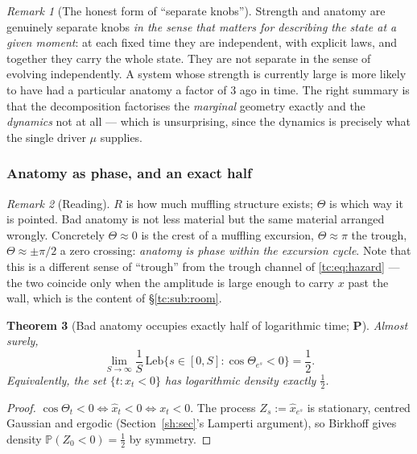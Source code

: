 \documentclass[11pt]{article}
\numberwithin{equation}{section}
\theoremstyle{plain}
\newtheorem{theorem}{Theorem}[section]
\theoremstyle{definition}
\theoremstyle{remark}
\newtheorem{remark}[theorem]{Remark}
\newcommand{\PP}{\mathbb{P}}
\begin{document}
\begin{remark}[The honest form of ``separate knobs'']
\label{tc:rem:knobs}
Strength and anatomy are genuinely separate knobs \emph{in the sense
that matters for describing the state at a given moment}: at each fixed
time they are independent, with explicit laws, and together they carry
the whole state. They are not separate in the sense of evolving
independently. A system whose strength is currently large is more likely
to have had a particular anatomy a factor of $3$ ago in time. The right
summary is that the decomposition factorises the \emph{marginal}
geometry exactly and the \emph{dynamics} not at all --- which is
unsurprising, since the dynamics is precisely what the single driver
$\mu$ supplies.
\end{remark}

\subsubsection{Anatomy as phase, and an exact half}
\label{tc:subsub:half}

\begin{remark}[Reading]\label{tc:rem:reading}
$R$ is how much muffling structure exists; $\Theta$ is which way it is
pointed. Bad anatomy is not less material but the same material arranged
wrongly. Concretely $\Theta\approx0$ is the crest of a muffling
excursion, $\Theta\approx\pi$ the trough, $\Theta\approx\pm\pi/2$ a zero
crossing: \emph{anatomy is phase within the excursion cycle}. Note that
this is a different sense of ``trough'' from the trough channel of
\eqref{tc:eq:hazard} --- the two coincide only when the amplitude is
large enough to carry $x$ past the wall, which is the content of
\S\ref{tc:sub:room}.
\end{remark}

\begin{theorem}[Bad anatomy occupies exactly half of logarithmic time;
\textbf{P}]\label{tc:thm:half}
Almost surely,
\begin{equation}\label{tc:eq:half}
\lim_{S\to\infty}\frac1S\,\mathrm{Leb}
\bigl\{s\in[0,S]:\cos\Theta_{e^{s}}<0\bigr\}=\frac12 .
\end{equation}
Equivalently, the set $\{t:x_t<0\}$ has logarithmic density exactly
$\tfrac12$.
\end{theorem}

\begin{proof}
$\cos\Theta_t<0\iff\hat x_t<0\iff x_t<0$. The process
$Z_s:=\hat x_{e^{s}}$ is stationary, centred Gaussian and ergodic
(Section~\ref{sh:sec}'s Lamperti argument), so Birkhoff gives density
$\PP(Z_0<0)=\tfrac12$ by symmetry.
\end{proof}
\end{document}
